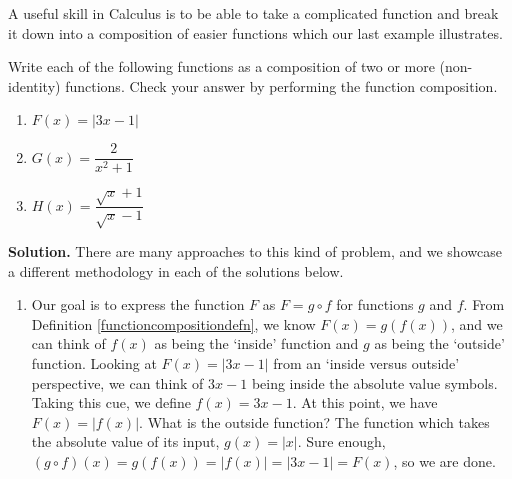 A useful skill in Calculus is to be able to take a complicated function and break it down into a composition of easier functions which our last example illustrates.

\begin{ex}  Write each of the following functions as a composition of two or more (non-identity) functions.  Check your answer by performing the function composition.

\begin{multicols}{3}
\begin{enumerate}

\item $F(x) = |3x-1|$

\item $G(x) = \dfrac{2}{x^2+1}$

\item  $H(x) = \dfrac{\sqrt{x}+1}{\sqrt{x}-1}$

\end{enumerate}
\end{multicols}

{ \bf Solution.}  There are many approaches to this kind of problem, and we showcase a different methodology in each of the solutions below.

\begin{enumerate}

\item  Our goal is to express the function $F$ as $F = g \circ f$ for functions $g$ and $f$.  From Definition \ref{functioncompositiondefn}, we know $F(x) = g(f(x))$, and we can think of $f(x)$ as being the `inside' function and $g$ as being the `outside' function.  Looking at $F(x) = |3x-1|$ from an `inside versus outside' perspective, we can think of $3x-1$ being inside the absolute value symbols.  Taking this cue, we define $f(x) = 3x-1$.  At this point, we have $F(x) = |f(x)|$.  What is the outside function?  The function which takes the absolute value of its input, $g(x) = |x|$. Sure enough,  $(g \circ f)(x) = g(f(x)) = |f(x)| = |3x-1| = F(x)$, so we are done.


\end{enumerate}
\end{ex}
